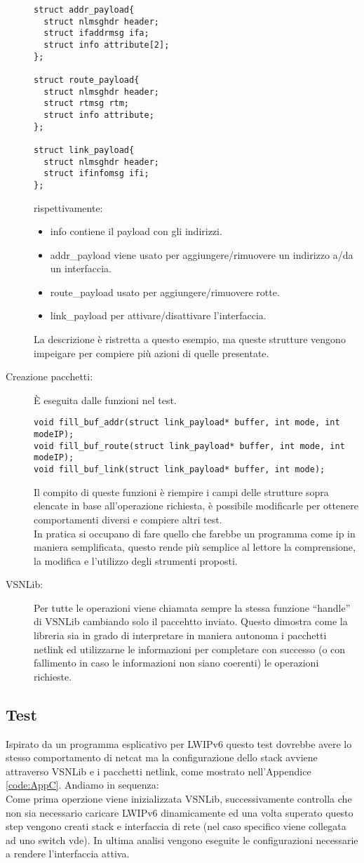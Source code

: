 \begin{description}
\begin{lstlisting}[style=CStyle]
  struct addr_payload{
  struct nlmsghdr header;
  struct ifaddrmsg ifa;
  struct info attribute[2];
};

struct route_payload{
  struct nlmsghdr header;
  struct rtmsg rtm;
  struct info attribute;
};

struct link_payload{
  struct nlmsghdr header;
  struct ifinfomsg ifi;
};

\end{lstlisting}
rispettivamente:
\begin{itemize}
  \item info contiene il payload con gli indirizzi.
  \item addr\_payload viene usato per aggiungere/rimuovere un indirizzo a/da un interfaccia.
  \item route\_payload usato per aggiungere/rimuovere rotte.
  \item link\_payload per attivare/disattivare l'interfaccia.
\end{itemize}
La descrizione \`e ristretta a questo esempio, ma queste strutture vengono impeigare per compiere pi\`u azioni di quelle presentate.
\item[Creazione pacchetti: ]\`E eseguita dalle funzioni nel test.
\begin{lstlisting}[style=CStyle]
void fill_buf_addr(struct link_payload* buffer, int mode, int modeIP);
void fill_buf_route(struct link_payload* buffer, int mode, int modeIP);
void fill_buf_link(struct link_payload* buffer, int mode);
\end{lstlisting}
Il compito di queste funzioni \`e riempire i campi delle strutture sopra elencate in base all'operazione richiesta, \`e possibile modificarle per ottenere comportamenti diversi e compiere altri test.\\
In pratica si occupano di fare quello che farebbe un programma come ip in maniera semplificata, questo rende pi\`u semplice al lettore la comprensione, la modifica e l'utilizzo degli strumenti proposti.
\item[VSNLib: ]Per tutte le operazioni viene chiamata sempre la stessa funzione ``handle'' di VSNLib cambiando solo il paccehtto inviato. Questo dimostra come la libreria sia in grado di interpretare in maniera autonoma i pacchetti netlink ed utilizzarne le informazioni per completare con successo (o con fallimento in caso le informazioni non siano coerenti) le operazioni richieste.
\end{description}
\subsection{Test}
Ispirato da un programma esplicativo per LWIPv6 questo test dovrebbe avere lo stesso comportamento di netcat ma la configurazione dello stack avviene attraverso VSNLib e i pacchetti netlink, come mostrato nell'Appendice \ref{code:AppC}.
Andiamo in sequenza:\\
Come prima operzione viene inizializzata VSNLib, successivamente controlla che non sia necessario caricare LWIPv6 dinamicamente ed una volta superato questo step vengono creati stack e interfaccia di rete (nel caso specifico viene collegata ad uno switch vde). In ultima analisi vengono eseguite le configurazioni necessarie a rendere l'interfaccia attiva.
